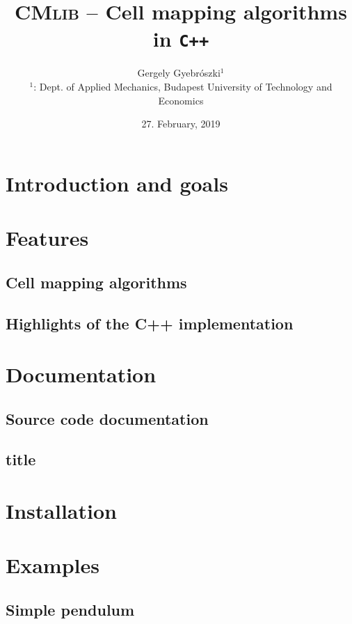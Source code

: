 \documentclass{article}
\title{\textsc{CMlib} -- Cell mapping algorithms in \texttt{C++}}
\author{Gergely Gyebrószki$^1$ \\
$^1$: Dept. of Applied Mechanics, Budapest University of Technology and Economics}
\date{27. February, 2019}
\begin{document}
\maketitle
	
\section{Introduction and goals}

\section{Features}

\subsection{Cell mapping algorithms}

\subsection{Highlights of the C++ implementation}

\section{Documentation}

\subsection{Source code documentation}

\subsection{title}

\section{Installation}

\section{Examples}

\subsection{Simple pendulum}
\end{document}
